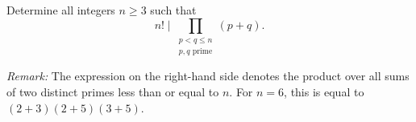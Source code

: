 Determine all integers $n\geq 3$ such that
\[
    n!\mid \prod_{\substack{p<q\leq n\\ p,q \text{ prime}}}(p+q).
\]

\emph{Remark:} The expression on the right-hand side denotes the product
over all sums of two distinct primes less than or equal to $n$.
For $n = 6$, this is equal to $(2+3)(2+5)(3+5)$.

